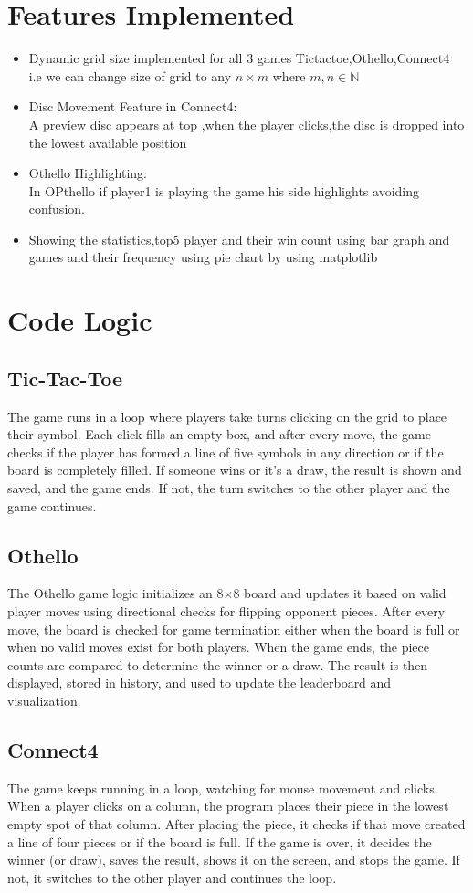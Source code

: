 \documentclass{article}
\begin{document}
\section{Features Implemented}
\begin{itemize}
\item{Dynamic grid size implemented for all 3 games Tictactoe,Othello,Connect4\\  i.e we can change size of grid to any $n \times m$ where $m,n \in \mathbb{N}$}
\item{Disc Movement Feature in Connect4:\\A preview disc appears at top ,when the player clicks,the disc is dropped into the lowest available position}
\item{Othello Highlighting:\\ In OPthello if player1 is playing the game his side highlights avoiding confusion.}
\item{Showing the statistics,top5 player and their win count using bar graph and games and their frequency using pie chart by using matplotlib}
\end{itemize}
\section{Code Logic}
\subsection{Tic-Tac-Toe}
The game runs in a loop where players take turns clicking on the grid to place their symbol. Each click fills an empty box, and after every move, the game checks if the player has formed a line of five symbols in any direction or if the board is completely filled. If someone wins or it’s a draw, the result is shown and saved, and the game ends. If not, the turn switches to the other player and the game continues.
\subsection{Othello}
The Othello game logic initializes an 8×8 board and updates it based on valid player moves using directional checks for flipping opponent pieces. After every move, the board is checked for game termination either when the board is full or when no valid moves exist for both players. When the game ends, the piece counts are compared to determine the winner or a draw. The result is then displayed, stored in history, and used to update the leaderboard and visualization.
\subsection{Connect4}
The game keeps running in a loop, watching for mouse movement and clicks. When a player clicks on a column, the program places their piece in the lowest empty spot of that column. After placing the piece, it checks if that move created a line of four pieces or if the board is full.
If the game is over, it decides the winner (or draw), saves the result, shows it on the screen, and stops the game. If not, it switches to the other player and continues the loop.
\end{document}

